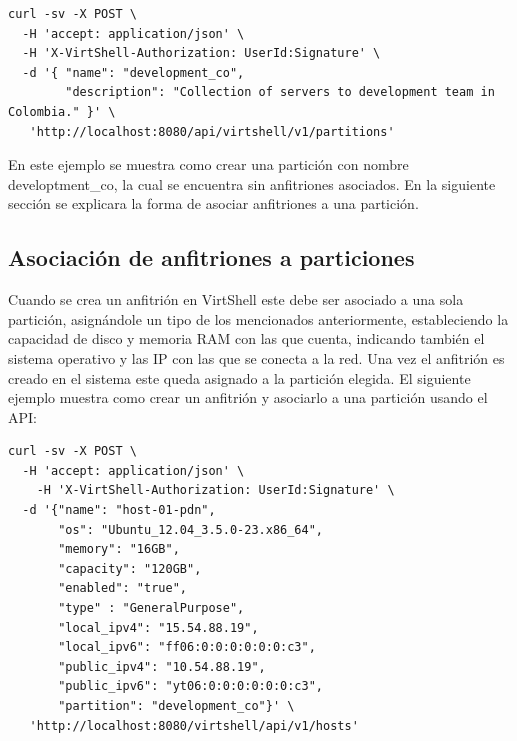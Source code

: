 
\begin{lstlisting}[style=json, caption=Petición HTTP para crear una partición]
curl -sv -X POST \
  -H 'accept: application/json' \
  -H 'X-VirtShell-Authorization: UserId:Signature' \
  -d '{ "name": "development_co",
        "description": "Collection of servers to development team in Colombia." }' \
   'http://localhost:8080/api/virtshell/v1/partitions'
\end{lstlisting}

\vspace{5mm}

En este ejemplo se muestra como crear una partición con nombre developtment\_co, la cual se encuentra sin anfitriones asociados. En la siguiente sección se explicara la forma de asociar anfitriones a una partición.  

\subsection{Asociación de anfitriones a particiones}
Cuando se crea un anfitrión en VirtShell este debe ser asociado a una sola partición, asignándole un tipo de los mencionados anteriormente, estableciendo la capacidad de disco y memoria RAM con las que cuenta, indicando también el sistema operativo y las IP con las que se conecta a la red. Una vez el anfitrión es creado en el sistema este queda asignado a la partición elegida. El siguiente ejemplo muestra como crear un anfitrión y asociarlo a una partición usando el API:

\vspace{5mm}

\begin{lstlisting}[style=json, caption=Petición HTTP para crear un anfitrión]
curl -sv -X POST \
  -H 'accept: application/json' \
    -H 'X-VirtShell-Authorization: UserId:Signature' \
  -d '{"name": "host-01-pdn",
       "os": "Ubuntu_12.04_3.5.0-23.x86_64",
       "memory": "16GB",
       "capacity": "120GB",
       "enabled": "true",
       "type" : "GeneralPurpose",
       "local_ipv4": "15.54.88.19",
       "local_ipv6": "ff06:0:0:0:0:0:0:c3",
       "public_ipv4": "10.54.88.19",
       "public_ipv6": "yt06:0:0:0:0:0:0:c3",
       "partition": "development_co"}' \
   'http://localhost:8080/virtshell/api/v1/hosts'
\end{lstlisting}

\vspace{5mm}

